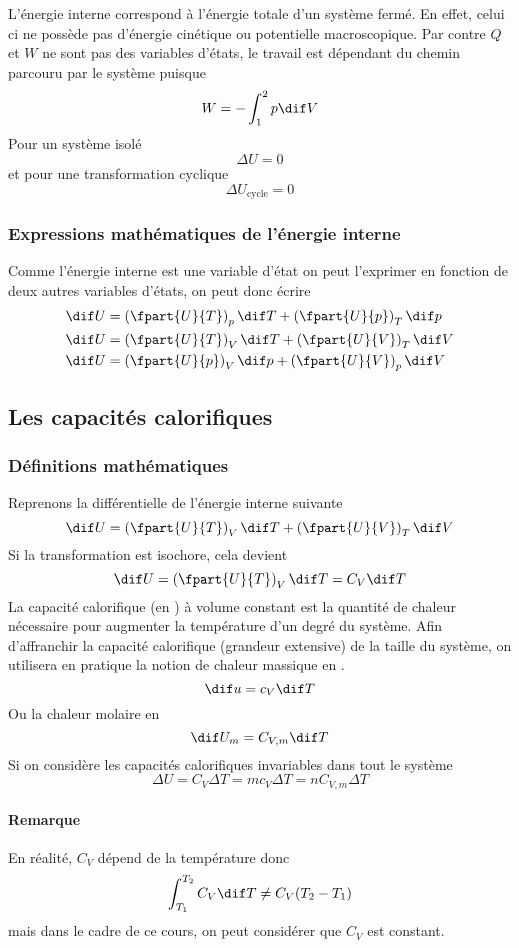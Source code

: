 L'énergie interne correspond à l'énergie totale d'un système fermé.
En effet, celui ci ne possède pas d'énergie cinétique ou
potentielle macroscopique.
Par contre $Q$ et $W$ ne sont pas des variables d'états,
le travail est dépendant du chemin parcouru par le système puisque
\[W = - \int_1^2p\dif V \]
Pour un système isolé
\[ \Delta U = 0 \]
et pour une transformation cyclique
\[ \Delta U_\mathrm{cycle} = 0 \]

\subsubsection{Expressions mathématiques de l'énergie interne}
Comme l'énergie interne est une variable d'état on peut l'exprimer en
fonction de deux autres variables d'états, on peut donc écrire
\begin{align*}
  \dif U & =
  \left(\fpart{U}{T}\right)_p \dif T +
  \left(\fpart{U}{p}\right)_T \dif p\\
  \dif U & =
  \left(\fpart{U}{T}\right)_V \dif T +
  \left(\fpart{U}{V}\right)_T \dif V\\
  \dif U & =
  \left(\fpart{U}{p}\right)_V \dif p +
  \left(\fpart{U}{V}\right)_p \dif V
\end{align*}

\subsection{Les capacités calorifiques}
\subsubsection{Définitions mathématiques}
Reprenons la différentielle de l'énergie interne suivante
\[ \dif U = \left(\fpart{U}{T}\right)_V \dif T +
\left(\fpart{U}{V}\right)_T \dif V \]
Si la transformation est isochore, cela devient
\[ \dif U = \left(\fpart{U}{T}\right)_V \dif T = C_V \dif T \]
La capacité calorifique (en \joule\per\kelvin) à volume constant est
la quantité de chaleur nécessaire pour
augmenter la température d'un degré du système.
Afin d'affranchir la capacité calorifique (grandeur extensive)
de la taille du système, on utilisera en pratique
la notion de chaleur massique en \joule\per\kilogram\cdot\kelvin.
\[ \dif u = c_V\dif T \]
Ou la chaleur molaire en \joule\per\mole\cdot\kelvin
\[ \dif U_m = C_{V,m}\dif T \]
Si on considère les capacités calorifiques invariables dans tout le système
\[ \Delta U = C_V \Delta T = mc_V\Delta T = nC_{V,m}\Delta T \]

\paragraph{Remarque}
En réalité, $C_V$ dépend de la température donc
\[ \int_{T_1}^{T_2} C_V \dif T \neq C_V(T_2 - T_1) \]
mais dans le cadre de ce cours, on peut considérer que $C_V$ est constant.

